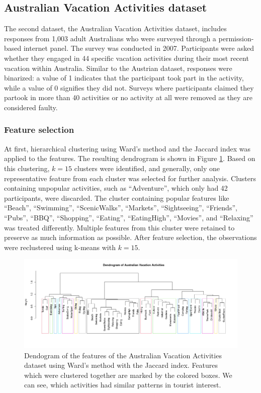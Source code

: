 \documentclass[article]{ajs}
\begin{document}
\subsection{Australian Vacation Activities dataset}

The second dataset, the Australian Vacation Activities dataset, includes responses from 1,003 adult Australians who were surveyed through a permission-based internet panel. The survey was conducted in 2007. Participants were asked whether they engaged in 44 specific vacation activities during their most recent vacation within Australia. Similar to the Austrian dataset, responses were binarized: a value of 1 indicates that the participant took part in the activity, while a value of 0 signifies they did not. Surveys where participants claimed they partook in more than 40 activities or no activity at all were removed as they are considered faulty.

\subsubsection{Feature selection}

At first, hierarchical clustering using Ward's method \citep{murtagh2014ward} and the Jaccard index was applied to the features. The resulting dendrogram is shown in Figure \ref{fig:aus_feature_clustering}. Based on this clustering, \( k = 15 \) clusters were identified, and generally, only one representative feature from each cluster was selected for further analysis. Clusters containing unpopular activities, such as ``Adventure'', which only had 42 participants, were discarded. The cluster containing popular features like ``Beach'', ``Swimming'', ``ScenicWalks'', ``Markets'', ``Sightseeing'', ``Friends'', ``Pubs'', ``BBQ'', ``Shopping'', ``Eating'', ``EatingHigh'', ``Movies'', and ``Relaxing'' was treated differently. Multiple features from this cluster were retained to preserve as much information as possible. After feature selection, the observations were reclustered using k-means with \( k = 15 \).


\begin{figure}[h!]
    \centering
    \includegraphics[width=1\textwidth]{aus_feature_clustering.png}
    \caption{Dendogram of the features of the Australian Vacation Activities dataset using Ward's method with the Jaccard index. Features which were clustered together are marked by the colored boxes. We can see, which activities had similar patterns in tourist interest.}
    \label{fig:aus_feature_clustering}
\end{figure}
\end{document}

